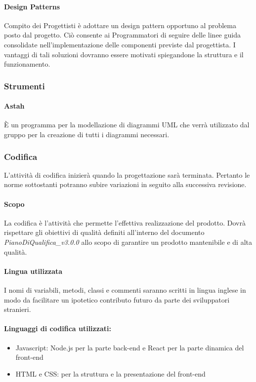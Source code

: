 \documentclass[11pt,a4paper]{article}
\begin{document}
{	\paragraph{Design Patterns\\} 
	Compito dei Progettisti è adottare un design pattern opportuno al problema posto dal progetto. Ciò consente ai Programmatori di seguire delle linee guida consolidate nell'implementazione delle componenti previste dal progettista. I vantaggi di tali soluzioni dovranno essere motivati spiegandone la struttura e il funzionamento.
	\subsubsection{Strumenti}
	\paragraph{Astah\\}
	È un programma per la modellazione di diagrammi UML che verrà utilizzato dal gruppo per la creazione di tutti i diagrammi necessari.
	
	\subsubsection{Codifica}
	L'attività di codifica inizierà quando la progettazione sarà terminata. Pertanto le norme sottostanti potranno subire variazioni in seguito alla successiva revisione.
	

	\paragraph{Scopo}
	La codifica è l'attività che permette l'effettiva realizzazione del prodotto.
	Dovrà rispettare gli obiettivi di qualità definiti all'interno del documento \textit{PianoDiQualifica\_v3.0.0} allo scopo di garantire un prodotto mantenibile e di alta qualità.
		
	\paragraph{Lingua utilizzata}
 
	I nomi di variabili, metodi, classi e commenti saranno scritti in lingua inglese in modo da facilitare un ipotetico contributo futuro da parte dei sviluppatori stranieri.
	
	\paragraph{Linguaggi di codifica utilizzati:}
	\begin{itemize}
		\item Javascript: Node.js per la parte back-end e React per la parte dinamica del front-end
		\item HTML e CSS: per la struttura e la presentazione del front-end
	\end{itemize}
	
}
\end{document}
